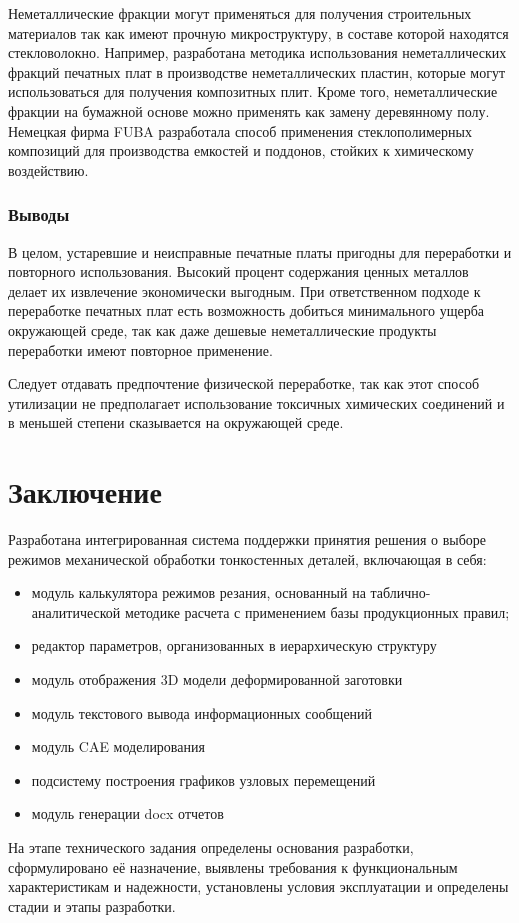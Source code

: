 \documentclass[14pt,oneside,final]{extreport}
\newcommand*\minus{\item[--]} %
\begin{document}
	Неметаллические фракции могут применяться для получения строительных материалов так как имеют прочную микроструктуру, в составе которой находятся стекловолокно. Например, разработана методика использования неметаллических фракций печатных плат в производстве неметаллических пластин, которые могут использоваться для получения композитных плит. Кроме того, неметаллические фракции на бумажной основе можно применять как замену деревянному полу. Немецкая фирма FUBA разработала способ применения стеклополимерных  композиций для производства емкостей и поддонов, стойких к химическому воздействию. 

	\subsection{Выводы}
	В целом, устаревшие и неисправные печатные платы пригодны для переработки и повторного использования. Высокий процент содержания ценных металлов делает их извлечение экономически выгодным. При ответственном подходе к переработке печатных плат есть возможность добиться минимального ущерба окружающей среде, так как даже дешевые неметаллические продукты переработки имеют повторное применение. 

	Следует отдавать предпочтение физической переработке, так как этот способ утилизации не предполагает использование токсичных химических соединений и в меньшей степени сказывается на окружающей среде. 
	\chapter*{Заключение}		
	Разработана интегрированная система поддержки принятия решения о выборе режимов механической обработки тонкостенных деталей, включающая в себя:
	 \begin{itemize}
	 	\minus модуль калькулятора режимов резания, основанный на таблично-аналитической методике расчета с применением базы продукционных правил;
	 	\minus редактор параметров, организованных в иерархическую структуру
	 	\minus модуль отображения 3D модели деформированной заготовки
	 	\minus модуль текстового вывода информационных сообщений
	 	\minus модуль CAE моделирования
	 	\minus подсистему построения графиков узловых перемещений 
	 	\minus модуль генерации docx отчетов
	 \end{itemize}
	На этапе технического задания определены основания разработки, сформулировано её назначение, выявлены требования к функциональным характеристикам и надежности, установлены условия эксплуатации и определены стадии и этапы разработки.
	
\end{document}
